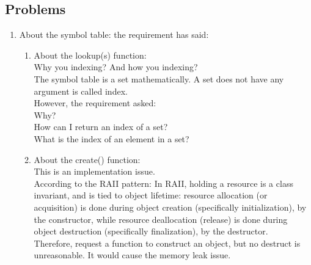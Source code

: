 \documentclass[12pt,a4paper]{article}
\begin{document}
\begin{CJK}{UTF8}{bsmi}
    \section{Problems}
    \begin{enumerate}
        \item About the symbol table:
              the requirement has said:\\
              \begin{enumerate}
                  \item About the lookup(s) function:\\
                        Why you indexing? And how you indexing?\\
                        The symbol table is a set mathematically. A set does not have any argument is called
                        index.\\
                        However, the requirement asked:\\
                        Why?\\
                        How can I return an index of a set?\\
                        What is the index of an element in a set?
                  \item About the create() function:\\
                        This is an implementation issue.\\
                        According to the RAII pattern: In RAII, holding a resource is a
                        class invariant, and is tied to object lifetime: resource allocation
                        (or acquisition) is done during object creation (specifically
                        initialization), by the constructor, while resource deallocation
                        (release) is done during object destruction (specifically finalization),
                        by the destructor. \\
                        Therefore, request a function to construct an object, but no destruct
                        is unreasonable. It would cause the memory leak issue.


\end{enumerate}
\end{enumerate}
\end{CJK}
\end{document}
